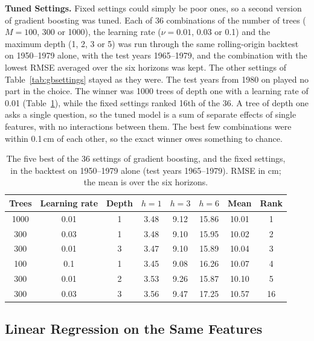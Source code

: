 \documentclass{article}
\begin{document}
\textbf{Tuned Settings.} Fixed settings could simply be poor ones, so a second version of gradient
boosting was tuned. Each of 36 combinations of the number of trees ($M = 100$, 300 or 1000), the
learning rate ($\nu = 0.01$, 0.03 or 0.1) and the maximum depth (1, 2, 3 or 5) was run through
the same rolling-origin backtest on 1950--1979 alone, with the test years 1965--1979, and the
combination with the lowest RMSE averaged over the six horizons was kept. The other settings of
Table~\ref{tab:gbsettings} stayed as they were. The test years from 1980 on played no part in the
choice. The winner was 1000 trees of depth one with a learning rate of 0.01
(Table~\ref{tab:tuning}), while the fixed settings ranked 16th of the 36. A tree of depth one asks
a single question, so the tuned model is a sum of separate effects of single features, with no
interactions between them. The best few combinations were within 0.1\,cm of each other, so the
exact winner owes something to chance.

\begin{table}[htbp]
\centering
\caption{The five best of the 36 settings of gradient boosting, and the fixed settings, in the
backtest on 1950--1979 alone (test years 1965--1979). RMSE in cm; the mean is over the six
horizons.}
\label{tab:tuning}
\small
\begin{tabular}{||c|c|c|c|c|c|c|c||}
\hline\hline
Trees & Learning rate & Depth & $h=1$ & $h=3$ & $h=6$ & Mean & Rank \\
\hline\hline
1000 & 0.01 & 1 & 3.48 & 9.12 & 15.86 & 10.01 & 1 \\
300 & 0.03 & 1 & 3.48 & 9.10 & 15.95 & 10.02 & 2 \\
300 & 0.01 & 3 & 3.47 & 9.10 & 15.89 & 10.04 & 3 \\
100 & 0.1 & 1 & 3.45 & 9.08 & 16.26 & 10.07 & 4 \\
300 & 0.01 & 2 & 3.53 & 9.26 & 15.87 & 10.10 & 5 \\
\hline
300 & 0.03 & 3 & 3.56 & 9.47 & 17.25 & 10.57 & 16 \\
\hline\hline
\end{tabular}
\end{table}

\subsection{Linear Regression on the Same Features}
\label{sec:linear}
\end{document}
